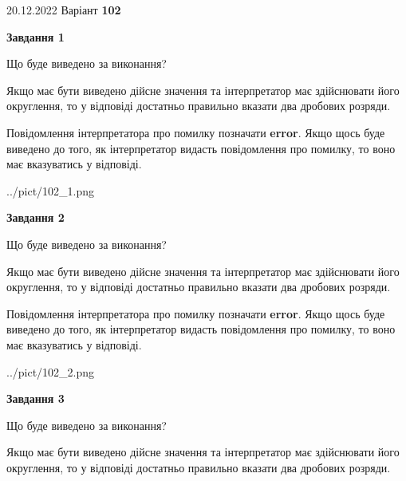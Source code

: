 \documentclass[12pt, ukrainian]{article}
\begin{document}
{20.12.2022 Варіант \No \textbf { 102 }\par}
{
\begin {Large}

{\begin {center}\textbf{Завдання 1}\end {center}}\par
Що буде виведено за виконання? \par

Якщо має бути виведено дійсне значення та інтерпретатор має здійснювати його округлення, 
то у відповіді достатньо правильно вказати два дробових розряди.

Повідомлення інтерпретатора про помилку позначати \textbf{error}.
Якщо щось буде виведено до того, як інтерпретатор видасть повідомлення про помилку, 
то воно має вказуватись у відповіді. \par

\begin{center}
	{../pict/102_1.png}
\end{center}
\newpage

{\begin {center}\textbf{Завдання 2}\end {center}}\par
Що буде виведено за виконання? \par

Якщо має бути виведено дійсне значення та інтерпретатор має здійснювати його округлення, 
то у відповіді достатньо правильно вказати два дробових розряди.

Повідомлення інтерпретатора про помилку позначати \textbf{error}.
Якщо щось буде виведено до того, як інтерпретатор видасть повідомлення про помилку, 
то воно має вказуватись у відповіді. \par

\begin{center}
	{../pict/102_2.png}
\end{center}
\newpage

{\begin {center}\textbf{Завдання 3}\end {center}}\par
Що буде виведено за виконання? \par

Якщо має бути виведено дійсне значення та інтерпретатор має здійснювати його округлення, 
то у відповіді достатньо правильно вказати два дробових розряди.


\end{Large}}
\end{document}
